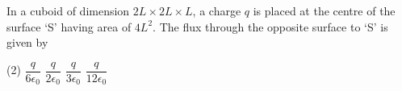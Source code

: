 \item In a cuboid of dimension \(2L \times 2L \times L\), a charge \(q\) is placed at the centre of the surface ‘S’ having area of \(4L^2\). The flux through the opposite surface to ‘S’ is given by
\begin{tasks}(2)
    \task \(\dfrac{q}{6\epsilon_0}\)
    \task \(\dfrac{q}{2\epsilon_0}\)
    \task \(\dfrac{q}{3\epsilon_0}\)
    \task \(\dfrac{q}{12\epsilon_0}\)
\end{tasks}